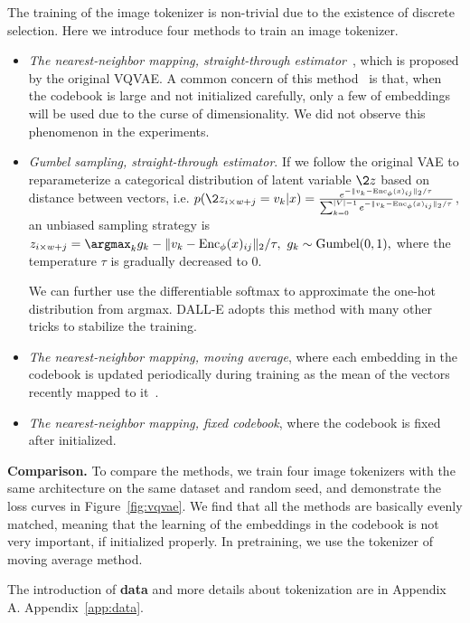 The training of the image tokenizer is non-trivial due to the existence of discrete selection. Here we introduce four methods to train an image tokenizer.

\begin{itemize}
  \item \emph{The nearest-neighbor mapping, straight-through estimator}~\cite{bengio2013estimating}, which is proposed by the original VQVAE. A common concern of this method~\cite{ramesh2021zero} is that, when the codebook is large and not initialized carefully, only a few of embeddings will be used due to the curse of dimensionality. We did not observe this phenomenon in the experiments.
\item \emph{Gumbel sampling, straight-through estimator}. If we follow the original VAE to reparameterize a categorical distribution of latent variable $\2z$ based on distance between vectors, i.e. $p(\2z_{i\times w + j}=v_k | x) = \frac{e^{-\|v_k-\text{Enc}_{\phi}(x)_{ij}\|_2/\tau}}{\sum_{k=0}^{|V|-1}e^{-\|v_k-\text{Enc}_{\phi}(x)_{ij}\|_2/\tau}}$, an unbiased sampling strategy is $z_{i\times w+j}=\argmax_k g_k -\|v_k-\text{Enc}_{\phi}(x)_{ij}\|_2/\tau,\  g_k \sim \text{Gumbel}(0,1),$
where the temperature $\tau$ is gradually decreased to 0. 

We can further use the differentiable softmax to approximate the one-hot distribution from argmax. DALL-E adopts this method with many other tricks to stabilize the training.
\item \emph{The nearest-neighbor mapping, moving average}, where each embedding in the codebook is updated periodically during training as the mean of the vectors recently mapped to it~\cite{van2017neural}.
\item \emph{The nearest-neighbor mapping, fixed codebook}, where the codebook is fixed after initialized.
\end{itemize}

\textbf{Comparison.} To compare the methods, we train four image tokenizers with the same architecture on the same dataset and random seed, and demonstrate the loss curves in Figure~\ref{fig:vqvae}. 
We find that all the methods are basically evenly matched, meaning that the learning of the embeddings in the codebook is not very important, if initialized properly. In pretraining, we use the tokenizer of moving average method.

The introduction of \textbf{data} and more details about tokenization are in \ifblind Appendix A.
\else
Appendix~\ref{app:data}.
\fi

